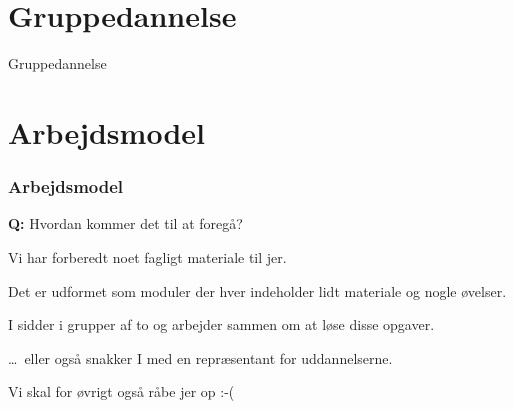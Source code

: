 
\section{Gruppedannelse}
\begin{frame}
  \vspace{32mm}
  \begin{center}
    \Huge{Gruppedannelse}
  \end{center}
\end{frame}

\section{Arbejdsmodel}
\begin{frame}
  \frametitle{Arbejdsmodel}
  \vspace{3mm}
  \textbf{Q:} Hvordan kommer det til at foregå?
  
  \pause
  \vspace{5mm}
  Vi har forberedt noet fagligt materiale til jer.
  
  \vspace{5mm}
  Det er udformet som moduler der hver indeholder lidt materiale og nogle øvelser.
  
  \vspace{5mm}
  I sidder i grupper af to og arbejder sammen om at løse disse opgaver.
  
  \pause
  \vspace{5mm}
  \ldots\ eller også snakker I med en repræsentant for uddannelserne.
  
  \pause
  \vspace{5mm}
  Vi skal for øvrigt også råbe jer op :-(
\end{frame}

